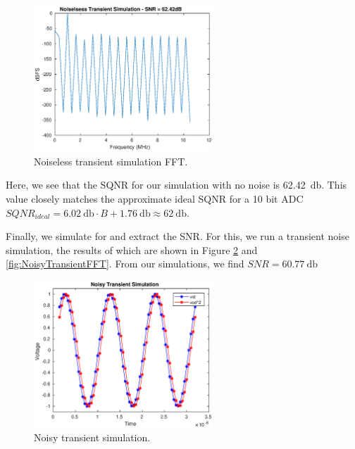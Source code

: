 \documentclass[letterpaper, notitlepage]{revtex4-1}
\begin{document}
\begin{figure}[h]
\begin{center}
\includegraphics[width=0.6\textwidth]{noiseless_transient_fft.eps}
\caption{Noiseless transient simulation FFT.}
\label{fig:NoiselessTransientFFT}
\end{center}
\end{figure}

Here, we see that the SQNR for our simulation with no noise is \SI{62.42}{\decibel}. This value closely matches the approximate ideal SQNR for a 10 bit ADC $SQNR_{ideal}=\SI{6.02}{\decibel}\cdot B+\SI{1.76}{\decibel}\approx\SI{62}{\decibel}$. 

Finally, we simulate for and extract the SNR. For this, we run a transient noise simulation, the results of which are shown in Figure \ref{fig:NoisyTransient} and \ref{fig:NoisyTransientFFT}. From our simulations, we find $SNR=\SI{60.77}{\decibel}$


\begin{figure}[h]
\begin{center}
\includegraphics[width=0.6\textwidth]{noisy_transient_sig.eps}
\caption{Noisy transient simulation.}
\label{fig:NoisyTransient}
\end{center}
\end{figure}
\end{document}

